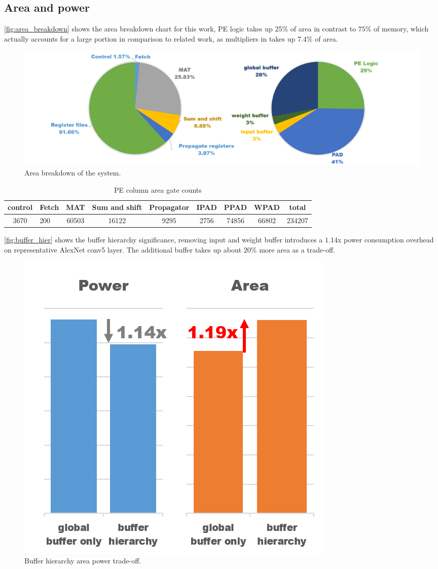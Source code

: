 \subsection{Area and power}
\autoref{fig:area_breakdown} shows the area breakdown chart for this work, PE logic takes up 25\% of area in contrast to $75\%$ of memory, which actually accounts for a large portion in comparison to related work, as multipliers in \cite{Eyeriss} takes up $7.4\%$ of area. 
\begin{figure}[h]
    \centering
    \includegraphics[width=1\linewidth]{inc/5_results/figure/area_breakdown.png}
    \caption{Area breakdown of the system.}
    \label{fig:area_breakdown}
\end{figure}
\begin{table}[h]
    \caption{PE column area gate counts}
    \label{tab:area_gate}
    \centering
    \footnotesize 
        \begin{tabular}{clccccccc}
        \toprule
        control  & Fetch  & MAT       & Sum and shift       & Propagator      & IPAD     & PPAD     & WPAD    & total       \\
        \midrule
        3670 & 200 & 60503 & 16122 & 9295 & 2756 & 74856 & 66802 & 234207\\
        \bottomrule
        \end{tabular}
\end{table}
\autoref{fig:buffer_hier} shows the buffer hierarchy significance, removing input and weight buffer introduces a $1.14$x power consumption overhead on representative AlexNet conv5 layer. The additional buffer takes up about $20\%$ more area as a trade-off. 
\begin{figure}[h]
    \centering
    \includegraphics[width=0.4\linewidth]{inc/5_results/figure/buffer_hier.png}
    \caption{Buffer hierarchy area power trade-off.}
    \label{fig:buffer_hier}
\end{figure}
